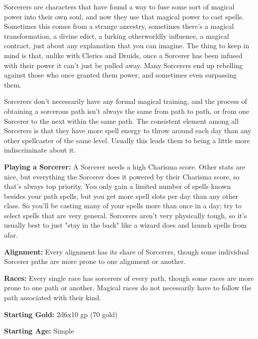 
Sorcerers are characters that have found a way to fuse some sort of magical power into their own soul, and now they use that magical power to cast spells. Sometimes this comes from a strange ancestry, sometimes there's a magical transformation, a divine edict, a lurking otherworldly influence, a magical contract, just about any explanation that you can imagine. The thing to keep in mind is that, unlike with Clerics and Druids, once a Sorcerer has been infused with their power it can't just be pulled away. Many Sorcerers end up rebelling against those who once granted them power, and sometimes even surpassing them.

Sorcerers don't necessarily have any formal magical training, and the process of obtaining a sorcerous path isn't always the same from path to path, or from one Sorcerer to the next within the same path. The consistent element among all Sorcerers is that they have more spell energy to throw around each day than any other spellcaster of the same level. Usually this leads them to being a little more indiscriminate about it.

\textbf{Playing a Sorcerer:} A Sorcerer needs a high Charisma score. Other stats are nice, but everything the Sorcerer does it powered by their Charisma score, so that's always top priority. You only gain a limited number of spells known besides your path spells, but you get more spell slots per day than any other class. So you'll be casting many of your spells more than once in a day; try to select spells that are very general. Sorcerers aren't very physically tough, so it's usually best to just "stay in the back" like a wizard does and launch spells from afar.

\textbf{Alignment:} Every alignment has its share of Sorcerers, though some individual Sorcerer paths are more prone to one alignment or another.

\textbf{Races:} Every single race has sorcerers of every path, though some races are more prone to one path or another. Magical races do not necessarily have to follow the path associated with their kind.

\textbf{Starting Gold:} 2d6x10 gp (70 gold)

\textbf{Starting Age:} Simple

